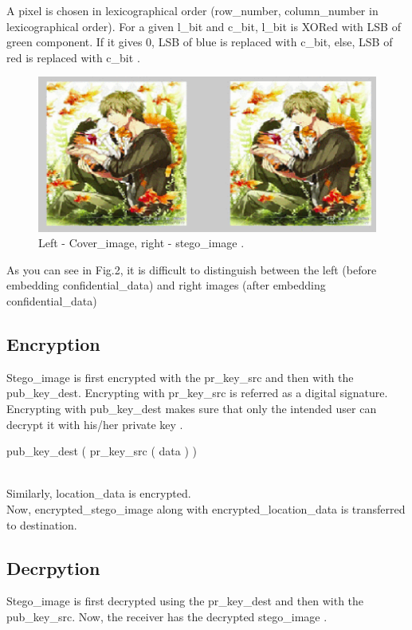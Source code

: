 \documentclass[conference]{IEEEtran}
\begin{document}
A pixel is chosen in lexicographical order (row\_number, column\_number in lexicographical order).
For a given l\_bit and c\_bit, l\_bit is XORed with LSB of green component.
If it gives 0, LSB of blue is replaced with c\_bit, else, LSB of red is replaced with c\_bit \cite{b2}.\\

\begin{figure}[H]
  \includegraphics[width=\linewidth]{cover_image_vs_stego_image.png}
  \caption{Left - Cover\_image, right - stego\_image \cite{b2}.}
\end{figure}

As you can see in Fig.2, it is difficult to distinguish between the left (before embedding confidential\_data) and right images (after embedding confidential\_data)

\subsection{Encryption}
Stego\_image is first encrypted with the pr\_key\_src and then with the pub\_key\_dest.
Encrypting with pr\_key\_src is referred as a digital signature.
Encrypting with pub\_key\_dest makes sure that only the intended user can decrypt it with his/her private key \cite{b2}.\\

\centerline{ pub\_key\_dest ( pr\_key\_src ( data ) ) }
\leavevmode \\
Similarly, location\_data is encrypted.\\

Now, encrypted\_stego\_image along with encrypted\_location\_data is transferred to destination.

\subsection{Decrpytion}
Stego\_image is first decrypted using the pr\_key\_dest and then with the pub\_key\_src.
Now, the receiver has the decrypted stego\_image .\\
\end{document}

